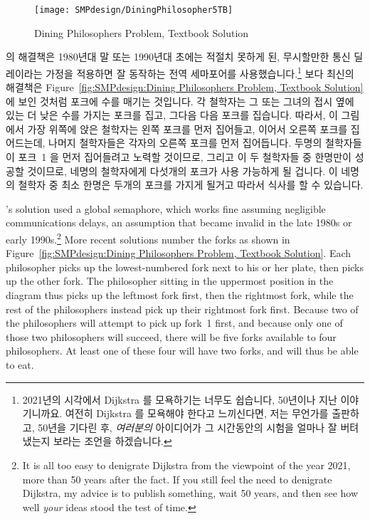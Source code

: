 \fi

\begin{figure}[tb]
\centering
\texttt{[image: SMPdesign/DiningPhilosopher5TB]}
\caption{Dining Philosophers Problem, Textbook Solution}
\end{figure}

 의 해결책은 1980년대 말 또는 1990년대 초에는
적절치 못하게 된, 무시할만한 통신 딜레이라는 가정을 적용하면 잘 동작하는 전역
세마포어를 사용했습니다.\footnote{
	2021년의 시각에서 Dijkstra 를 모욕하기는 너무도 쉽습니다, 50년이나 지난
	이야기니까요.
	여전히 Dijkstra 를 모욕해야 한다고 느끼신다면, 저는 무언가를 출판하고,
	50년을 기다린 후, \emph{여러분의} 아이디어가 그 시간동안의 시험을
	얼마나 잘 버텨냈는지 보라는 조언을 하겠습니다.}
보다 최신의 해결책은
Figure~\ref{fig:SMPdesign:Dining Philosophers Problem, Textbook Solution}
에 보인 것처럼 포크에 수를 매기는 것입니다.
각 철학자는 그 또는 그녀의 접시 옆에 있는 더 낮은 수를 가지는 포크를 집고,
그다음 다음 포크를 집습니다.
따라서, 이 그림에서 가장 위쪽에 앉은 철학자는 왼쪽 포크를 먼저 집어들고, 이어서
오른쪽 포크를 집어드는데, 나머지 철학자들은 각자의 오른쪽 포크를 먼저
집어듭니다.
두명의 철학자들이 포크~1 을 먼저 집어들려고 노력할 것이므로, 그리고 이 두
철학자들 중 한명만이 성공할 것이므로, 네명의 철학자에게 다섯개의 포크가 사용
가능하게 될 겁니다.
이 네명의 철학자 중 최소 한명은 두개의 포크를 가지게 될거고 따라서 식사를 할 수
있습니다.

\iffalse

's solution used a global semaphore,
which works fine assuming
negligible communications delays, an assumption that became invalid
in the late 1980s or early 1990s.\footnote{
	It is all too easy to denigrate Dijkstra from the viewpoint
	of the year 2021, more than 50 years after the fact.
	If you still feel the need to denigrate Dijkstra, my advice
	is to publish something, wait 50 years, and then see
	how well \emph{your} ideas stood the test of time.}
More recent solutions number the forks as shown in
Figure~\ref{fig:SMPdesign:Dining Philosophers Problem, Textbook Solution}.
Each philosopher picks up the lowest-numbered fork next to his or her
plate, then picks up the other fork.
The philosopher sitting in the uppermost position in the diagram thus
picks up the leftmost fork first, then the rightmost fork, while the
rest of the philosophers instead pick up their rightmost fork first.
Because two of the philosophers will attempt to pick up fork~1 first,
and because only one of those two philosophers will succeed,
there will be five forks available to four philosophers.
At least one of these four will have two forks, and will thus be able
to eat.


